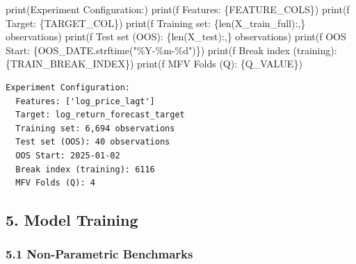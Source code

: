 \documentclass[
  letterpaper,
  DIV=11,
  numbers=noendperiod]{scrartcl}
\newenvironment{Shaded}{\begin{snugshade}}{\end{snugshade}}
\newcommand{\BuiltInTok}[1]{\textcolor[rgb]{0.00,0.23,0.31}{#1}}
\newcommand{\NormalTok}[1]{\textcolor[rgb]{0.00,0.23,0.31}{#1}}
\newcommand{\SpecialCharTok}[1]{\textcolor[rgb]{0.37,0.37,0.37}{#1}}
\newcommand{\SpecialStringTok}[1]{\textcolor[rgb]{0.13,0.47,0.30}{#1}}
\newcommand{\StringTok}[1]{\textcolor[rgb]{0.13,0.47,0.30}{#1}}
\begin{document}
\begin{Shaded}
\begin{Highlighting}[]
\BuiltInTok{print}\NormalTok{(}\StringTok{\textquotesingle{}Experiment Configuration:\textquotesingle{}}\NormalTok{)}
\BuiltInTok{print}\NormalTok{(}\SpecialStringTok{f\textquotesingle{}  Features: }\SpecialCharTok{\{}\NormalTok{FEATURE\_COLS}\SpecialCharTok{\}}\SpecialStringTok{\textquotesingle{}}\NormalTok{)}
\BuiltInTok{print}\NormalTok{(}\SpecialStringTok{f\textquotesingle{}  Target: }\SpecialCharTok{\{}\NormalTok{TARGET\_COL}\SpecialCharTok{\}}\SpecialStringTok{\textquotesingle{}}\NormalTok{)}
\BuiltInTok{print}\NormalTok{(}\SpecialStringTok{f\textquotesingle{}  Training set: }\SpecialCharTok{\{}\BuiltInTok{len}\NormalTok{(X\_train\_full)}\SpecialCharTok{:,\}}\SpecialStringTok{ observations\textquotesingle{}}\NormalTok{)}
\BuiltInTok{print}\NormalTok{(}\SpecialStringTok{f\textquotesingle{}  Test set (OOS): }\SpecialCharTok{\{}\BuiltInTok{len}\NormalTok{(X\_test)}\SpecialCharTok{:,\}}\SpecialStringTok{ observations\textquotesingle{}}\NormalTok{)}
\BuiltInTok{print}\NormalTok{(}\SpecialStringTok{f\textquotesingle{}  OOS Start: }\SpecialCharTok{\{}\NormalTok{OOS\_DATE}\SpecialCharTok{.}\NormalTok{strftime(}\StringTok{"\%Y{-}\%m{-}}\SpecialCharTok{\%d}\StringTok{"}\NormalTok{)}\SpecialCharTok{\}}\SpecialStringTok{\textquotesingle{}}\NormalTok{)}
\BuiltInTok{print}\NormalTok{(}\SpecialStringTok{f\textquotesingle{}  Break index (training): }\SpecialCharTok{\{}\NormalTok{TRAIN\_BREAK\_INDEX}\SpecialCharTok{\}}\SpecialStringTok{\textquotesingle{}}\NormalTok{)}
\BuiltInTok{print}\NormalTok{(}\SpecialStringTok{f\textquotesingle{}  MFV Folds (Q): }\SpecialCharTok{\{}\NormalTok{Q\_VALUE}\SpecialCharTok{\}}\SpecialStringTok{\textquotesingle{}}\NormalTok{)}
\end{Highlighting}
\end{Shaded}

\begin{verbatim}
Experiment Configuration:
  Features: ['log_price_lagt']
  Target: log_return_forecast_target
  Training set: 6,694 observations
  Test set (OOS): 40 observations
  OOS Start: 2025-01-02
  Break index (training): 6116
  MFV Folds (Q): 4
\end{verbatim}

\subsection{5. Model Training}\label{model-training}

\subsubsection{5.1 Non-Parametric
Benchmarks}\label{non-parametric-benchmarks}
\end{document}

